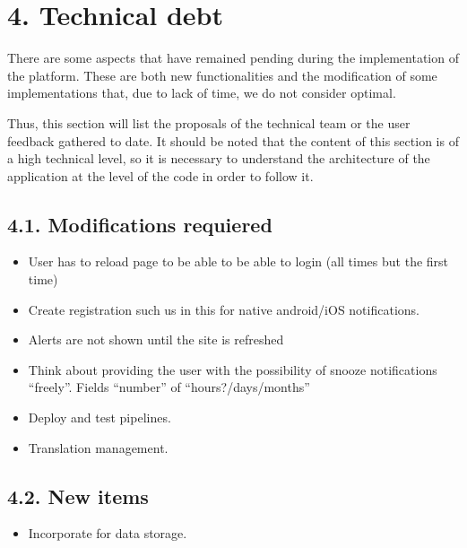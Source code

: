 \documentclass[letterpaper,10pt,english]{sphinxmanual}
\begin{document}
\chapter{4. Technical debt}
\label{\detokenize{pages/Technical debt:technical-debt}}\label{\detokenize{pages/Technical debt::doc}}
There are some aspects that have remained pending during the implementation of the platform. These are both new functionalities and the modification of some implementations that, due to lack of time, we do not consider optimal.

Thus, this section will list the proposals of the technical team or the user feedback gathered to date.
It should be noted that the content of this section is of a high technical level, so it is necessary to understand the architecture of the application at the level of the code in order to follow it.


\section{4.1. Modifications requiered}
\label{\detokenize{pages/Technical debt:modifications-requiered}}\begin{itemize}
\item {} 
User has to reload page to be able to be able to login (all times but the first time)

\item {} 
Create registration such us in this  for native android/iOS notifications.

\item {} 
Alerts are not shown until the site is refreshed

\item {} 
Think about providing the user with the possibility of snooze notifications “freely”. Fields “number” of “hours?/days/months”

\item {} 
Deploy and test pipelines.

\item {} 
Translation management.

\end{itemize}


\section{4.2. New items}
\label{\detokenize{pages/Technical debt:new-items}}\begin{itemize}
\item {} 
Incorporate  for data storage.

\end{itemize}



\renewcommand{\indexname}{Index}
\printindex
\end{document}
